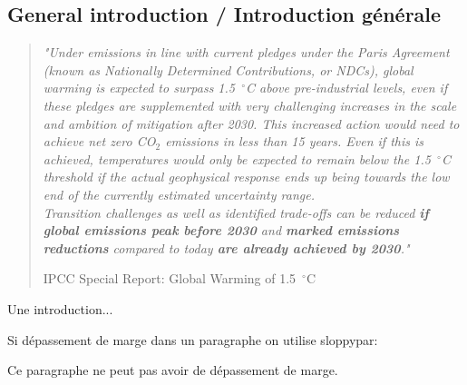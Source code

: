 {}

\vspace*{-1cm}
\begin{flushright}
\section*{\fontsize{20pt}{20pt}\selectfont\textnormal{General introduction / Introduction générale}}
\end{flushright}
\vspace{2cm}

\chead[\fancyplain{}{}]
      {\fancyplain{}{}}
\lfoot[\fancyplain{}{}]%
      {\fancyplain{}{}}
\cfoot[\fancyplain{}{\thepage}]
      {\fancyplain{}{\thepage}}
\rfoot[\fancyplain{}{}]%
     {\fancyplain{}{\scriptsize}}
     





\begin{sloppypar}
	\blockquote[IPCC Special Report: Global Warming of 1.5~$^\circ$C {\citep{Rogelj2018}}]{\textit{"Under  emissions  in  line  with  current  pledges  under  the  Paris  Agreement  (known  as  Nationally  Determined  Contributions,  or  NDCs),  global  warming  is  expected  to  surpass  1.5~$^\circ$C  above  pre-industrial  levels,  even  if  these  pledges  are  supplemented  with  very  challenging  increases  in  the  scale  and  ambition  of  mitigation  after  2030.  This  increased  action  would  need  to  achieve  net  zero  CO$_2$  emissions  in  less  than  15  years.  Even if this is achieved, temperatures would only be expected to remain below the 1.5~$^\circ$C threshold if the actual geophysical response ends up being towards the low end of the currently estimated uncertainty range.\\Transition challenges as well as identified trade-offs can be reduced \textbf{if global emissions peak before 2030} and \textbf{marked emissions reductions} compared  to  today  \textbf{are  already  achieved  by  2030}."\\}}
\end{sloppypar}

Une introduction...

Si dépassement de marge dans un paragraphe on utilise sloppypar:

\begin{sloppypar}
	Ce paragraphe ne peut pas avoir de dépassement de marge.
\end{sloppypar}

\adjustmtc